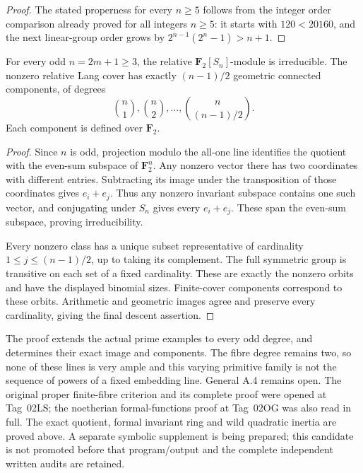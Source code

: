 \begin{proof}
The stated properness for every \(n\ge5\) follows from the
integer order comparison already proved for all integers
\(n\ge5\): it starts with \(120<20160\), and the next
linear-group order grows by \(2^{n-1}(2^n-1)>n+1\).
\end{proof}

\begin{corollary}
\label{cor:root-all-odd-double-cover-orbits}
For every odd \(n=2m+1\ge3\), the relative
\(\mathbf F_2[S_n]\)-module is irreducible. The nonzero
relative Lang cover has exactly \((n-1)/2\) geometric
connected components, of degrees
\[
              \binom n1,\binom n2,\ldots,
                             \binom n{(n-1)/2}.
\]
Each component is defined over \(\mathbf F_2\).
\end{corollary}
\begin{proof}
Since \(n\) is odd, projection modulo the all-one line
identifies the quotient with the even-sum subspace of
\(\mathbf F_2^n\). Any nonzero vector there has two
coordinates with different entries. Subtracting its image under
the transposition of those coordinates gives \(e_i+e_j\).
Thus any nonzero invariant subspace contains one such vector,
and conjugating under \(S_n\) gives every \(e_i+e_j\).
These span the even-sum subspace, proving irreducibility.

Every nonzero class has a unique subset representative of
cardinality \(1\le j\le(n-1)/2\), up to taking its
complement. The full symmetric group is transitive on each
set of a fixed cardinality. These are exactly the nonzero
orbits and have the displayed binomial sizes. Finite-cover
components correspond to these orbits. Arithmetic and geometric
images agree and preserve every cardinality, giving the final
descent assertion.
\end{proof}

\begin{remark}
\label{rem:root-all-odd-double-cover-scope}
The proof extends the actual prime examples to every odd degree,
and determines their exact image and components. The fibre
degree remains two, so none of these lines is very ample and
this varying primitive family is not the sequence of powers of
a fixed embedding line. General A.4 remains open.
The original proper finite-fibre criterion and its complete
proof were opened at Tag~02LS; the noetherian formal-functions
proof at Tag~02OG was also read in full. The exact quotient,
formal invariant ring and wild quadratic inertia are proved
above. A separate symbolic supplement is being prepared; this
candidate is not promoted before that program/output and the
complete independent written audits are retained.
\end{remark}
